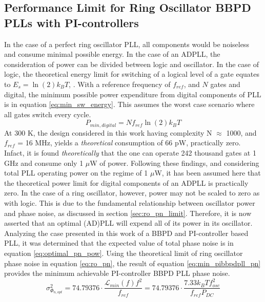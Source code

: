 \subsection{Performance Limit for Ring Oscillator BBPD PLLs with PI-controllers}\label{sec:fomjit_limit}
	In the case of a perfect ring oscillator PLL, all components would be noiseless and consume minimal possible energy. In the case of an ADPLL, the consideration of power can be divided between logic and oscillator. In the case of logic, the theoretical energy limit for switching of a logical level of a gate equates to $E_s = \ln(2) k_B T$, \cite{Lundstrom2006}. With a reference frequency of $f_{ref}$, and $N$ gates and digital, the minimum possible power expenditure from digital components of PLL is in equation \ref{eq:min_sw_energy}. This assumes the worst case scenario where all gates switch every cycle.
	\begin{equation}\label{eq:min_sw_energy}
		P_{min,digital} = Nf_{ref}\ln(2) k_B T
	\end{equation}
	At 300 K, the design considered in this work having complexity N $\approx$ 1000, and $f_{ref}$ = 16 MHz, yields a \textit{theoretical} consumption of 66 pW, practically zero. Infact, it is found \textit{theoretically} that the one can operate 242 thousand gates at 1 GHz and consume only 1 $\mu$W of power. Following these findings, and considering total PLL operating power on the regime of 1 $\mu$W, it has been assumed here that the theoretical power limit for digital components of an ADPLL is practically zero. In the case of a ring oscillator, however, power may not be scaled to zero as with logic. This is due to the fundamental relationship between oscillator power and phase noise, as discussed in section \ref{sec:ro_pn_limit}. Therefore, it is now asserted that an optimal (AD)PLL will expend all of its power in its oscillator. Analyzing the case presented in this work of a BBPD and PI-controller based PLL, it was determined that the expected value of total phase noise is in equation \ref{eq:optimal_pn_pow}. Using the theoretical limit of ring oscillator phase noise in equation \ref{eq:ro_pn}, the result of equation \ref{eq:min_pibbpdpll_pn} provides the minimum achievable PI-controller BBPD PLL phase noise.
	\begin{equation}\label{eq:min_pibbpdpll_pn}
		\sigma_{\Phi_{n,opt}}^2 = 74.79376\cdot \frac{\mathcal{L}_{min}(f)f^2}{f_{ref}} = 74.79376\cdot  \frac{7.33 k_B T f_{osc}^2}{f_{ref}P_{DC}}
	\end{equation}

